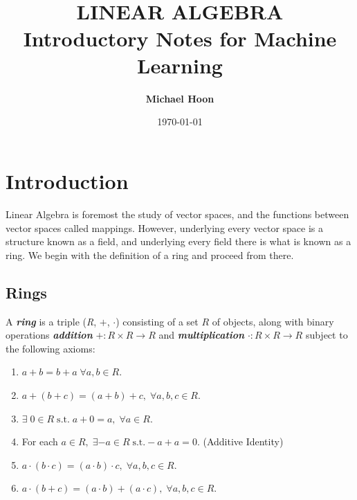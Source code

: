 \documentclass{article}
\begin{document}

\title{ \normalsize \textsc{}
		\\ [2.0cm]
		\HRule{1.5pt} \\
		\LARGE \textbf{\uppercase{Linear Algebra}
		\HRule{2.0pt} \\ [0.6cm] \LARGE{Introductory Notes for Machine Learning} \vspace*{10\baselineskip}}
		}
\date{\today}
\author{\textbf{Michael Hoon}}

\maketitle
\newpage

\tableofcontents
\newpage


\section{Introduction}

Linear Algebra is foremost the study of vector spaces, and the functions between vector spaces called mappings. However, underlying every vector space is a structure known as a field, and underlying every field there is what is known as a ring. We begin with the definition of a ring and proceed from there.

\subsection{Rings}

\begin{definition}
    A \textbf{\textit{ring}} is a triple (\textit{R}, $+$, $\cdot$) consisting of a set $R$ of objects, along with binary operations \textbf{\textit{addition}} $+:R \times R \rightarrow R$ and \textbf{\textit{multiplication}} $\cdot : R \times R \rightarrow R$ subject to the following axioms: 
    \begin{enumerate}
        \item $a + b = b + a \; \forall a, b \in R$. 
        \item $a + (b + c) = (a + b) + c, \; \forall a, b, c \in R$.
        \item $\exists \; 0 \in R \; \text{s.t.} \; a + 0 = a, \; \forall a \in R$. 
        \item For each $a \in R, \; \exists -a \in R \; \text{s.t.} - a + a = 0$. (Additive Identity)
        \item $a \cdot (b \cdot c) = (a \cdot b) \cdot c, \; \forall a, b, c \in R$.
        \item $a \cdot (b + c) = (a \cdot b) + (a \cdot c) , \; \forall a, b, c \in R$.
    \end{enumerate}
\end{definition}
\end{document}
